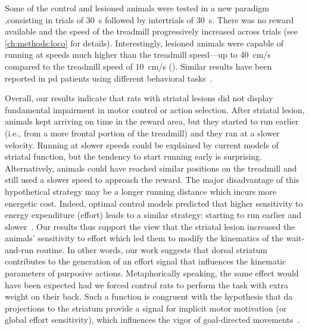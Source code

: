Some of the control and lesioned animals were tested in a new paradigm ,consisting in trials of 30~s followed by intertrials of 30~s.
There was no reward available and the speed of the treadmill progressively increased across trials (see \autoref{ch:methods:loco} for details).
Interestingly, lesioned animals were capable of running at speeds much higher than the treadmill speed---up to 40~cm/s compared to the treadmill speed of 10~cm/s ().
Similar results have been reported in \gls{pd} patients using different behavioral tasks~\cite{Mazzoni2007, Schmidt2008Brain}.
\par
Overall, our results indicate that rats with striatal lesions did not display fundamental impairment in motor control or action selection.
After striatal lesion, animals kept arriving on time in the reward area, but they started to run earlier (i.e., from a more frontal portion of the treadmill) and they ran at a slower velocity.
Running at slower speeds could be explained by current models of striatal function, but the tendency to start running early is surprising.
Alternatively, animals could have reached similar positions on the treadmill and still used a slower speed to approach the reward.
The major disadvantage of this hypothetical strategy may be a longer running distance which incurs more energetic cost.
Indeed, optimal control models predicted that higher sensitivity to energy expenditure (effort) leads to a similar strategy: starting to run earlier and slower~\cite{JuradoParras2020}.
Our results thus support the view that the striatal lesion increased the animals' sensitivity to effort which led them to modify the kinematics of the wait-and-run routine.
In other words, our work suggests that dorsal striatum contributes to the generation of an effort signal that influences the kinematic parameters of purposive actions.
Metaphorically speaking, the same effect would have been expected had we forced control rats to perform the task with extra weight on their back.
Such a function is congruent with the hypothesis that \gls{da} projections to the striatum provide a signal for implicit motor motivation (or global effort sensitivity), which influences the vigor of goal-directed movements~\cite{Mazzoni2007}.
\par





